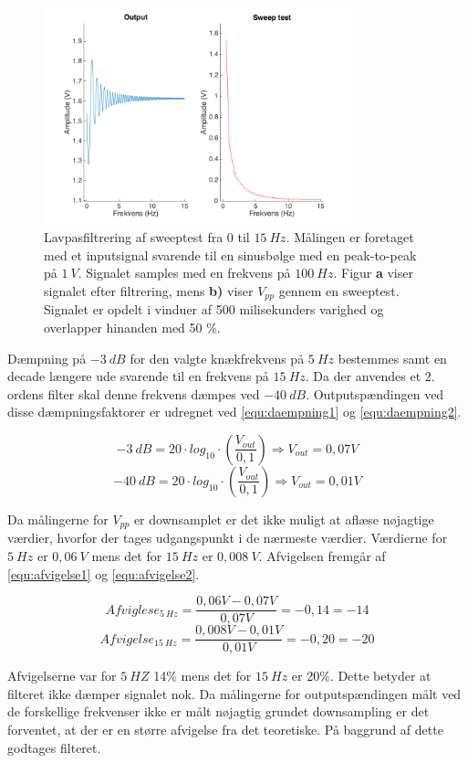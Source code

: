 \begin{figure}[H]
\centering
\includegraphics[width=0.8\textwidth]{figures/Lavpass_test}
\caption{Lavpasfiltrering af sweeptest fra 0 til $15~Hz$. Målingen er foretaget med et inputsignal svarende til en sinusbølge med en peak-to-peak på $1~V$. Signalet samples med en frekvens på $100~Hz$. Figur \textbf{a} viser signalet efter filtrering, mens \textbf{b)} viser $V_{pp}$ gennem en sweeptest. Signalet er opdelt i vinduer af 500 milisekunders varighed og overlapper hinanden med 50 \%.}
\label{fig:lavps_sweep}
\end{figure}


Dæmpning på $-3~dB$ for den valgte knækfrekvens på $5~Hz$ bestemmes samt en decade længere ude svarende til en frekvens på $15~Hz$. Da der anvendes et 2. ordens filter skal denne frekvens dæmpes ved $-40~dB$. Outputspændingen ved disse dæmpningsfaktorer er udregnet ved \autoref{equ:daempning1} og \autoref{equ:daempning2}. 

\begin{equation} \label{equ:daempning1}
-3~dB = 20 \cdot log_{10} \cdot (\frac{V_{out}}{0,1}) \Rightarrow V_{out} = 0,07 V
\end{equation}
\begin{equation} \label{equ:daempning2}
-40~dB = 20 \cdot log_{10} \cdot (\frac{V_{out}}{0,1}) \Rightarrow V_{out} = 0,01 V
\end{equation}

\noindent
Da målingerne for $V_{pp}$ er downsamplet er det ikke muligt at aflæse nøjagtige værdier, hvorfor der tages udgangspunkt i de nærmeste værdier. Værdierne for $5~Hz$ er $0,06~V$ mens det for $15~Hz$ er $0,008~V$. Afvigelsen fremgår af \autoref{equ:afvigelse1} og \autoref{equ:afvigelse2}.


\begin{equation} \label{equ:afvigelse1}
Afviglese_{5~Hz} = \frac{0,06V-0,07V}{0,07V} = -0,14  = - 14%
\end{equation}
\begin{equation} \label{equ:afvigelse2}
Afvigelse_{15~Hz} = \frac{0,008V-0,01V}{0,01V} = -0,20  = -20%
\end{equation}

\noindent 
Afvigelserne var for $5~HZ$ 14\% mens det for $15~Hz$ er 20\%. Dette betyder at filteret ikke dæmper signalet nok. Da målingerne for outputspændingen målt ved de forskellige frekvenser ikke er målt nøjagtig grundet downsampling er det forventet, at der er en større afvigelse fra det teoretiske. På baggrund af dette godtages filteret. 
